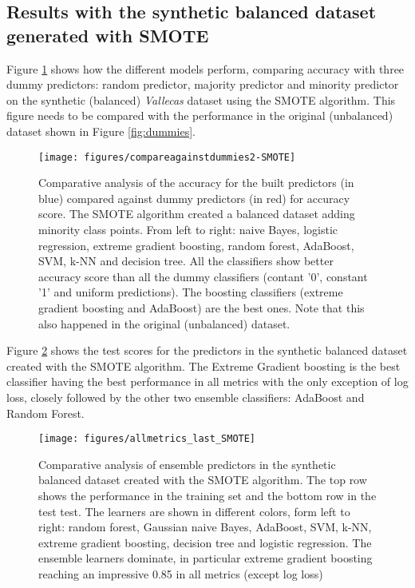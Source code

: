 \documentclass[11pt]{article}
\theoremstyle{definition}
\theoremstyle{remark}
\begin{document}
\subsection{Results with the synthetic balanced dataset generated with SMOTE}
\label{se:resimbalance}

Figure \ref{fig:dummiesSMOTE} shows how the different models perform, comparing accuracy with three dummy predictors: random predictor, majority predictor and minority predictor on the synthetic (balanced) \emph{Vallecas} dataset using the SMOTE algorithm. This figure needs to be compared with the performance in the original (unbalanced) dataset shown in Figure \ref{fig:dummies}.
\begin{figure}[H] 
        \centering
        \texttt{[image: figures/compareagainstdummies2-SMOTE]}
        \caption{Comparative analysis of the accuracy for the built predictors (in blue) compared against dummy predictors (in red) for accuracy score. The SMOTE algorithm created a balanced dataset adding minority class points.   
        From left to right: naive Bayes, logistic regression, extreme gradient boosting, random forest, AdaBoost, SVM, k-NN and decision tree. All the classifiers show better accuracy score than all the dummy classifiers (contant '0', constant '1' and uniform predictions). The boosting classifiers (extreme gradient boosting and AdaBoost) are the best ones. Note that this also happened in the original (unbalanced) dataset.
        } \label{fig:dummiesSMOTE}
\end{figure}


Figure \ref{fig:allmetricsensembleSMOTE} shows the test scores for the predictors in the synthetic balanced dataset created with the SMOTE algorithm. The Extreme Gradient boosting is the best classifier having the best performance in all metrics with the only exception of log loss, closely followed by the other two ensemble classifiers: AdaBoost and Random Forest. 

\begin{figure}[H] 
        \centering
        \texttt{[image: figures/allmetrics\_last\_SMOTE]}
        \caption{Comparative analysis of ensemble predictors in the synthetic balanced dataset created with the SMOTE algorithm. The top row shows the performance in the training set and the bottom row in the test test. The learners are shown in different colors, form left to right: random forest, Gaussian naive Bayes, AdaBoost, SVM, k-NN, extreme gradient boosting, decision tree and logistic regression. The ensemble learners dominate, in particular  extreme gradient boosting reaching an impressive 0.85 in all metrics (except log loss)} \label{fig:allmetricsensembleSMOTE}
\end{figure}
\end{document}

